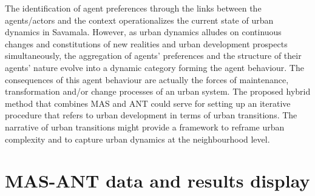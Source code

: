 \documentclass[11pt]{report}
\begin{document}
The identification of agent preferences through the links between the agents/actors and the context operationalizes the current state of urban dynamics in Savamala.
However, as urban dynamics alludes on continuous changes and constitutions of new realities and urban development prospects simultaneously, the aggregation of agents' preferences and the structure of their agents' nature evolve into a dynamic category forming the agent behaviour.
The consequences of this agent behaviour are actually the forces of maintenance, transformation and/or change processes of an urban system.
The proposed hybrid method that combines MAS and ANT could serve for setting up an iterative procedure that refers to urban development in terms of urban transitions. The narrative of urban transitions might provide a framework to reframe urban complexity and to capture urban dynamics at the neighbourhood level.

\chapter{MAS-ANT data and results display}
\end{document}
